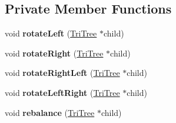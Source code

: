 \subsection*{Private Member Functions}
\begin{DoxyCompactItemize}
\item 
\mbox{\label{class_tri_tree_a3941d9f8c976c69392cdad32b6c5091d}} 
void {\bfseries rotate\+Left} (\mbox{\hyperlink{class_tri_tree}{Tri\+Tree}} $\ast$child)
\item 
\mbox{\label{class_tri_tree_a5eb3cbd936fd6911f0864e437dd11209}} 
void {\bfseries rotate\+Right} (\mbox{\hyperlink{class_tri_tree}{Tri\+Tree}} $\ast$child)
\item 
\mbox{\label{class_tri_tree_a9838f8fa97b53336cb104110fb5381bf}} 
void {\bfseries rotate\+Right\+Left} (\mbox{\hyperlink{class_tri_tree}{Tri\+Tree}} $\ast$child)
\item 
\mbox{\label{class_tri_tree_a7bd50859afd22131b7165e083cf42752}} 
void {\bfseries rotate\+Left\+Right} (\mbox{\hyperlink{class_tri_tree}{Tri\+Tree}} $\ast$child)
\item 
\mbox{\label{class_tri_tree_a8451d8033afab411a4fb6c96be16a5a2}} 
void {\bfseries rebalance} (\mbox{\hyperlink{class_tri_tree}{Tri\+Tree}} $\ast$child)
\end{DoxyCompactItemize}
